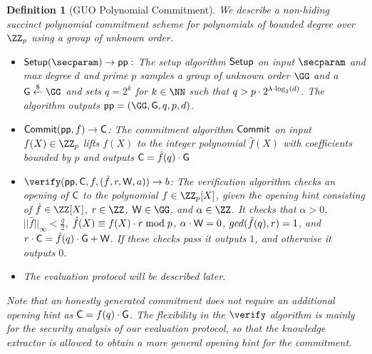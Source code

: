 \documentclass[11pt]{article}
\theoremstyle{Definition}
\newtheorem{definition}{Definition}
\begin{document}
\begin{definition}[GUO Polynomial Commitment]
We describe a non-hiding succinct polynomial commitment scheme for polynomials of bounded degree over $\ZZ_p$ using a group of unknown order.
\begin{itemize}
	\item $\setup(\secparam) \rightarrow \crs:$
The setup algorithm $\textsf{{Setup}}$ on input $\secparam$ and max degree $d$ and prime $p$ samples a group of unknown order $\GG$ and a $\Generator \sample \GG$ and sets $q=2^k$ for $k \in \NN$ such that $q>p\cdot 2^{\lambda \cdot \log_2(d)}$. The algorithm outputs $\crs=(\GG,\Generator,q,p,d)$.

\item $\textsf{{Commit}}(\textsf{pp}, f) \rightarrow \mathsf{C}$: The commitment algorithm $\textsf{{Commit}}$ on input $f(X)\in \ZZ_p$ lifts $f(X)$ to the integer polynomial $\hat{f}(X)$ with coefficients bounded by $p$ and outputs $\mathsf{C} =\hat{f}(q) \cdot \mathsf{G}$
\item $\verify(\crs, \Commitment, f, (\hat{f}, \denom,  \gr{W}, a)) \rightarrow b$: 
The verification algorithm checks an opening of $\mathsf{C}$ to the polynomial $f \in \ZZ_p[X]$, given the opening hint consisting of $\hat{f}\in \ZZ[X]$, $\denom \in \ZZ$, $\gr{W} \in \GG$, and $\alpha \in \ZZ$. It checks that $\alpha > 0$, $||\hat{f}||_\infty < \frac{q}{2}$, $\hat{f}(X) \equiv f(X)\cdot r \bmod p$, $\alpha\cdot \mathsf{W}=0$, $gcd(\hat{f}(q), r) = 1$, and $r \cdot \mathsf{C} =\hat{f}(q)\cdot \mathsf{G} +\mathsf{W}$. If these checks pass it outputs $1$, and otherwise it outputs $0$. 
\item The evaluation protocol will be described later.
\end{itemize}
Note that an honestly generated commitment does not require an additional opening hint as $\mathsf{C} = f(q) \cdot \mathsf{G}$. The flexibility in the $\verify$ algorithm is mainly for the security analysis of our evaluation protocol, so that the knowledge extractor is allowed to obtain a more general opening hint for the commitment. 
\end{definition}
\end{document}
